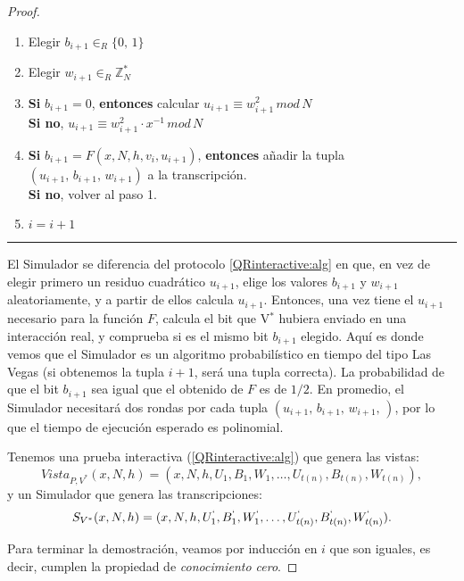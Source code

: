 \begin{proof}
	\begin{enumerate}
		\item Elegir $b_{i+1} \in_R \{0,\,1\}$
		
		\item Elegir $w_{i+1} \in_R \mathbb{Z}^*_N$
		
		\item \textbf{Si} $b_{i+1} = 0$, \textbf{entonces} calcular \qquad $u_{i+1} \equiv w_{i+1}^2 \, mod \,  N$ \\
			  \textbf{Si no}, \qquad \qquad \qquad \qquad \qquad \qquad \: $u_{i+1} \equiv w_{i+1}^2 \cdot x^{-1} \, mod \,  N$
			  
		\item \textbf{Si} $b_{i+1} = F(x,N,h,v_i,u_{i+1})$, \textbf{entonces} añadir la tupla \\ $(u_{i+1},\,b_{i+1},\,w_{i+1})$ a la transcripción. \\
			  \textbf{Si no}, volver al paso 1.
		
		\item $i = i+1$
		
	\end{enumerate}
	
	\rule{\textwidth}{1pt}
	
	\hfill
	
	El Simulador se diferencia del protocolo \ref{QRinteractive:alg} en que, en vez de elegir primero un residuo cuadrático $u_{i+1}$, elige los valores $b_{i+1}$ y $w_{i+1}$ aleatoriamente, y a partir de ellos calcula $u_{i+1}$. Entonces, una vez tiene el $u_{i+1}$ necesario para la función $F$, calcula el bit que V$^*$ hubiera enviado en una interacción real, y comprueba si es el mismo bit $b_{i+1}$ elegido. Aquí es donde vemos que el Simulador es un algoritmo probabilístico en tiempo del tipo Las Vegas (si obtenemos la tupla $i+1$, será una tupla correcta). La probabilidad de que el bit $b_{i+1}$ sea igual que el obtenido de $F$ es de $1/2$. En promedio, el Simulador necesitará dos rondas por cada tupla $(u_{i+1},\,b_{i+1},\,w_{i+1},\,)$, por lo que el tiempo de ejecución esperado es polinomial. 
	
	
	\hfil
	
	Tenemos una prueba interactiva (\ref{QRinteractive:alg}) que genera las vistas:
	\[ Vista_{P,V^*}(x,N,h) = (x,N,h,U_1,B_1,W_1,\dots , U_{t(n)}, B_{t(n)}, W_{t(n)}), \]
	y un Simulador que genera las transcripciones:
	\[ S_{V^*}(x,N,h)= (x,N,h,U_1^`,B_1^`,W_1^`,\dots , U_{t(n)}^`, B_{t(n)}^`, W_{t(n)}^`).\]
	
	Para terminar la demostración, veamos por inducción en $i$ que son iguales, es decir, cumplen la propiedad de \textit{conocimiento cero}.
	

\end{proof}
